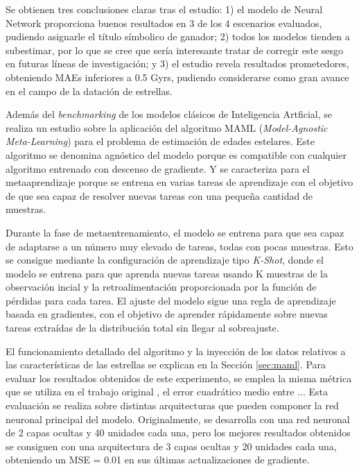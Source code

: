\vspace{0.5cm}

Se obtienen tres conclusiones claras tras el estudio: 1) el modelo de Neural Network proporciona buenos resultados en 3 de los 4 escenarios evaluados, pudiendo asignarle el título símbolico de ganador; 2) todos los modelos tienden a subestimar, por lo que se cree que sería interesante tratar de corregir este sesgo en futuras líneas de investigación; y 3) el estudio revela resultados prometedores, obteniendo MAEs inferiores a 0.5 Gyrs, pudiendo considerarse como gran avance en el campo de la datación de estrellas.

\vspace{0.25cm}
Además del \emph{benchmarking} de los modelos clásicos de Inteligencia Artficial, se realiza un estudio sobre la aplicación del algoritmo MAML (\emph{Model-Agnostic Meta-Learning}) \cite{finn2017modelagnostic} para el problema de estimación de edades estelares. Este algoritmo se denomina agnóstico del modelo porque es compatible con cualquier algoritmo entrenado con descenso de gradiente. Y se caracteriza para el metaaprendizaje porque se entrena en varias tareas de aprendizaje con el objetivo de que sea capaz de resolver nuevas tareas con una pequeña cantidad de muestras.

\vspace{0.25cm} 

Durante la fase de metaentrenamiento, el modelo se entrena para que sea capaz de adaptarse a un número muy elevado de tareas, todas con pocas muestras. Esto se consigue mediante la configuración de aprendizaje tipo \emph{K-Shot}, donde el modelo se entrena para que aprenda nuevas tareas usando K muestras de la observación incial y la retroalimentación proporcionada por la función de pérdidas para cada tarea. El ajuste del modelo sigue una regla de aprendizaje basada en gradientes, con el objetivo de aprender rápidamente sobre nuevas tareas extraídas de la distribución total sin llegar al sobreajuste. 

\vspace{0.25cm}

El funcionamiento detallado del algoritmo y la inyección de los datos relativos a las características de las estrellas se explican en la Sección \ref{sec:maml}. Para evaluar los resultados obtenidos de este experimento, se emplea la misma métrica que se utiliza en el trabajo original \cite{finn2017modelagnostic}, el error cuadrático medio entre ... %
Esta evaluación se realiza sobre distintas arquitecturas que pueden componer la red neuronal principal del modelo. Originalmente, se desarrolla con una red neuronal de 2 capas ocultas y 40 unidades cada una, pero los mejores resultados obtenidos se consiguen con una arquitectura de 3 capas ocultas y 20 unidades cada una, obteniendo un MSE = 0.01 en sus últimas actualizaciones de gradiente.


